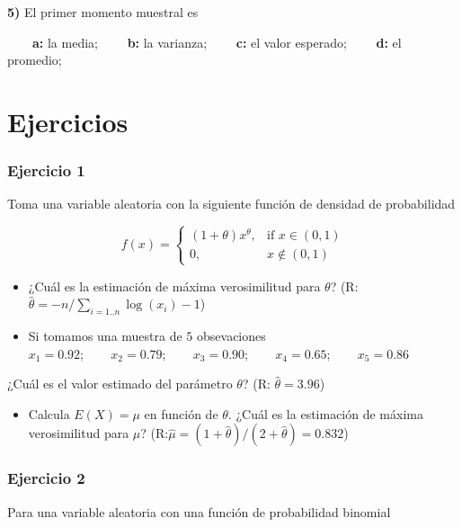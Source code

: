 \documentclass[
]{book}
\providecommand{\tightlist}{%
  \setlength{\itemsep}{0pt}\setlength{\parskip}{0pt}}
\begin{document}
\textbf{5)} El primer momento muestral es

\textbf{\(\qquad\)a:} la media;
\textbf{\(\qquad\)b:} la varianza;
\textbf{\(\qquad\)c:} el valor esperado;
\textbf{\(\qquad\)d:} el promedio;

\hypertarget{ejercicios-10}{%
\section{Ejercicios}\label{ejercicios-10}}

\hypertarget{ejercicio-1-9}{%
\subsubsection{Ejercicio 1}\label{ejercicio-1-9}}

Toma una variable aleatoria con la siguiente función de densidad de probabilidad

\[
f(x)=
\begin{cases}
    (1+\theta)x^\theta,& \text{if } x\in (0,1)\\
    0,&  x\notin (0,1)
\end{cases}
\]

\begin{itemize}
\item
  ¿Cuál es la estimación de máxima verosimilitud para \(\theta\)? (R:\(\hat{\theta}=-n/\sum_{i=1..n} \log(x_i)-1\))
\item
  Si tomamos una muestra de \(5\) obsevaciones
  \(x_1 = 0.92; \qquad x_2 = 0.79; \qquad x_3 = 0.90; \qquad x_4 = 0.65; \qquad x_5 = 0.86\)
\end{itemize}

¿Cuál es el valor estimado del parámetro \(\theta\)? (R: \(\hat{\theta}=3.96\))

\begin{itemize}
\tightlist
\item
  Calcula \(E(X)=\mu\) en función de \(\theta\). ¿Cuál es la estimación de máxima verosimilitud para \(\mu\)? (R:\(\hat{\mu}=(1+\hat{\theta})/(2+\hat{\theta})=0.832\))
\end{itemize}

\hypertarget{ejercicio-2-9}{%
\subsubsection{Ejercicio 2}\label{ejercicio-2-9}}

Para una variable aleatoria con una función de probabilidad binomial
\end{document}
